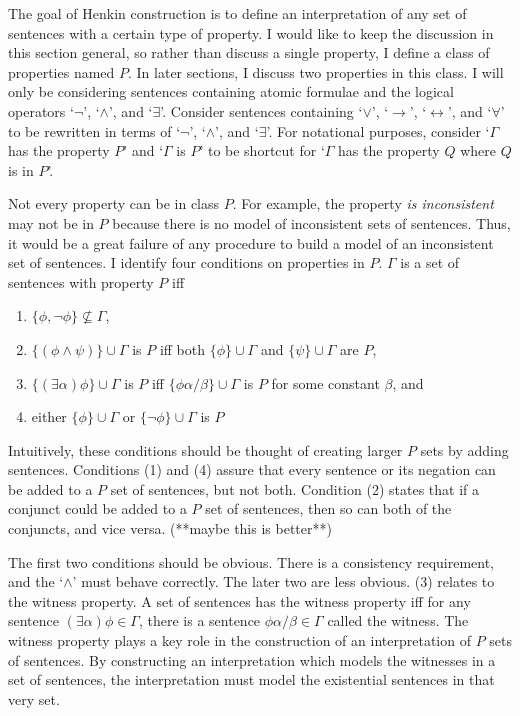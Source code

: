 \documentclass[12pt]{article}
\theoremstyle{definition}
\theoremstyle{remark}
\begin{document}
The goal of Henkin construction is to define an interpretation of any set of sentences with a certain type of property. I would like to keep the discussion in this section general, so rather than discuss a single property, I define a class of properties named $P$. In later sections, I discuss two properties in this class. I will only be considering sentences containing atomic formulae and the logical operators `$\neg$', `$\land$', and `$\exists$'. Consider sentences containing `$\lor$', `$\rightarrow$', `$\leftrightarrow$', and `$\forall$' to be rewritten in terms of `$\neg$', `$\land$', and `$\exists$'. For notational purposes, consider `$\Gamma$ has the property $P$' and `$\Gamma$ is $P$' to be shortcut for `$\Gamma$ has the property $Q$ where $Q$ is in $P$'.

Not every property can be in class $P$. For example, the property \textit{is inconsistent} may not be in $P$ because there is no model of inconsistent sets of sentences. Thus, it would be a great failure of any procedure to build a model of an inconsistent set of sentences. I identify four conditions on properties in $P$. $\Gamma$ is a set of sentences with property $P$ iff

\begin{enumerate}
	\item[(1)] $\{ \phi, \neg\phi \} \not\subseteq \Gamma$,
	\item[(2)] $\{ (\phi \land \psi) \} \cup \Gamma$ is $P$ iff both $\{ \phi \} \cup \Gamma$ and $\{ \psi \} \cup \Gamma$ are $P$,
	\item[(3)] $\{ (\exists \alpha)\phi \} \cup \Gamma$ is $P$ iff $\{ \phi\alpha/\beta \} \cup \Gamma$ is $P$ for some constant $\beta$, and
	\item[(4)] either $\{ \phi \} \cup \Gamma$ or $\{ \neg\phi \} \cup \Gamma$ is $P$
\end{enumerate}

Intuitively, these conditions should be thought of creating larger $P$ sets by adding sentences. Conditions (1) and (4) assure that every sentence or its negation can be added to a $P$ set of sentences, but not both. Condition (2) states that if a conjunct could be added to a $P$ set of sentences, then so can both of the conjuncts, and vice versa. (**maybe this is better**)

The first two conditions should be obvious. There is a consistency requirement, and the `$\land$' must behave correctly. The later two are less obvious. (3) relates to the witness property. A set of sentences has the witness property iff for any sentence $(\exists \alpha)\phi \in \Gamma$, there is a sentence $\phi\alpha/\beta \in \Gamma$ called the witness. The witness property plays a key role in the construction of an interpretation of $P$ sets of sentences. By constructing an interpretation which models the witnesses in a set of sentences, the interpretation must model the existential sentences in that very set.
\end{document}
